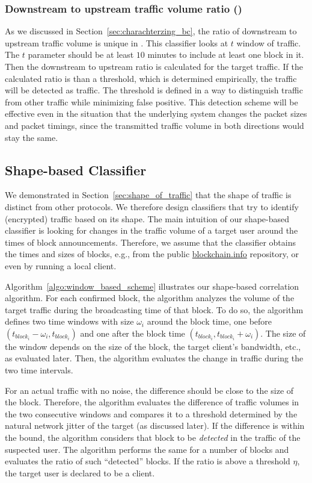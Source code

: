 \subsubsection{Downstream to upstream traffic volume ratio ()}
As we discussed in Section~\ref{sec:charachterzing_bc}, the ratio of downstream to upstream traffic volume is unique in \bc. This classifier looks at $t$ window of \bc traffic. The $t$ parameter should be at least $10$ minutes to include at least one block in it.
Then the downstream to upstream ratio is calculated for the target traffic. If the calculated ratio is  than a threshold, which is determined empirically, the traffic will be detected as \bc traffic. The threshold is defined in a way to distinguish \bc traffic from other traffic while minimizing false positive. This detection scheme will be effective even in the situation that the underlying system changes the packet sizes and packet timings, since the transmitted traffic volume in both directions would stay the same.

\subsection{Shape-based Classifier}\label{window-sec}

We demonstrated in Section~\ref{sec:shape_of_traffic} that the shape of \bc traffic is distinct from other protocols. 
We therefore design classifiers that try to identify (encrypted) \bc traffic based on its shape. 
The main intuition of our shape-based classifier is looking for changes in the traffic volume of a target user around the times of block announcements. Therefore, we assume that the classifier obtains the times and sizes of \bc blocks, e.g., from the public \url{blockchain.info} repository, or even by running a local \bc client.

Algorithm~\ref{algo:window_based_scheme} illustrates our shape-based correlation algorithm.
For each confirmed \bc block, the algorithm analyzes the volume of the target traffic during the broadcasting time of that block. 
To do so, the algorithm 
defines two time windows with size $\omega_i$ around the block time, 
one before $(t_{block_i}-\omega_i, t_{block_i})$ and one after the block time $(t_{block_i}, t_{block_i} +\omega_i)$.
The size of the window depends on the size of the block, the target client's bandwidth, etc., as evaluated later. 
Then, the algorithm evaluates the change in traffic during the two time intervals.  

For an actual \bc traffic with no noise, the difference should be close to the size of the block. 
Therefore, the algorithm evaluates the difference of traffic volumes in the two consecutive windows and 
compares it to a threshold determined by the natural network jitter of the target (as discussed later).
If the difference is within the bound, the algorithm considers that block to be \emph{detected} in the traffic of the suspected user. The algorithm performs the same for a number of blocks and evaluates the ratio of such ``detected'' blocks. 
If the ratio is above a threshold $\eta$, the target user is declared to be a \bc client. 


